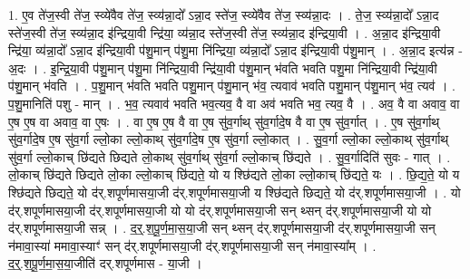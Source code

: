 \documentclass[17pt]{extarticle}
\begin{document}
1. ए॒व ते॑ज॒स्वी ते॑ज॒ स्व्ये॑वैव ते॑ज॒ स्व्य॑न्ना॒दो᳚ ऽन्ना॒द स्ते॑ज॒ स्व्ये॑वैव ते॑ज॒ स्व्य॑न्ना॒दः । . ते॒ज॒ स्व्य॑न्ना॒दो᳚ ऽन्ना॒द स्ते॑ज॒स्वी ते॑ज॒ स्व्य॑न्ना॒द इ॑न्द्रिया॒वी न्द्रि॑या॒ व्य॑न्ना॒द स्ते॑ज॒स्वी ते॑ज॒ स्व्य॑न्ना॒द इ॑न्द्रिया॒वी । . अ॒न्ना॒द इ॑न्द्रिया॒वी न्द्रि॑या॒ व्य॑न्ना॒दो᳚ ऽन्ना॒द इ॑न्द्रिया॒वी प॑शु॒मान् प॑शु॒मा नि॑न्द्रिया॒ व्य॑न्ना॒दो᳚ ऽन्ना॒द इ॑न्द्रिया॒वी प॑शु॒मान् । . अ॒न्ना॒द इत्य॑न्न - अ॒दः । . इ॒न्द्रि॒या॒वी प॑शु॒मान् प॑शु॒मा नि॑न्द्रिया॒वी न्द्रि॑या॒वी प॑शु॒मान् भ॑वति भवति पशु॒मा नि॑न्द्रिया॒वी न्द्रि॑या॒वी प॑शु॒मान् भ॑वति । . प॒शु॒मान् भ॑वति भवति पशु॒मान् प॑शु॒मान् भ॑व॒ त्यवाव॑ भवति पशु॒मान् प॑शु॒मान् भ॑व॒ त्यव॑ । . प॒शु॒मानिति॑ पशु - मान् । . भ॒व॒ त्यवाव॑ भवति भव॒त्यव॒ वै वा अव॑ भवति भव॒ त्यव॒ वै । . अव॒ वै वा अवाव॒ वा ए॒ष ए॒ष वा अवाव॒ वा ए॒षः । . वा ए॒ष ए॒ष वै वा ए॒ष सु॑व॒र्गाथ् सु॑व॒र्गादे॒ष वै वा ए॒ष सु॑व॒र्गात् । . ए॒ष सु॑व॒र्गाथ् सु॑व॒र्गादे॒ष ए॒ष सु॑व॒र्गा ल्लो॒का ल्लो॒काथ् सु॑व॒र्गादे॒ष ए॒ष सु॑व॒र्गा ल्लो॒कात् । . सु॒व॒र्गा ल्लो॒का ल्लो॒काथ् सु॑व॒र्गाथ् सु॑व॒र्गा ल्लो॒काच् छि॑द्यते छिद्यते लो॒काथ् सु॑व॒र्गाथ् सु॑व॒र्गा ल्लो॒काच् छि॑द्यते । . सु॒व॒र्गादिति॑ सुवः - गात् । . लो॒काच् छि॑द्यते छिद्यते लो॒का ल्लो॒काच् छि॑द्यते॒ यो य श्छि॑द्यते लो॒का ल्लो॒काच् छि॑द्यते॒ यः । . छि॒द्य॒ते॒ यो य श्छि॑द्यते छिद्यते॒ यो द॑र्.शपूर्णमासया॒जी द॑र्.शपूर्णमासया॒जी य श्छि॑द्यते छिद्यते॒ यो द॑र्.शपूर्णमासया॒जी । . यो द॑र्.शपूर्णमासया॒जी द॑र्.शपूर्णमासया॒जी यो यो द॑र्.शपूर्णमासया॒जी सन् थ्सन् द॑र्.शपूर्णमासया॒जी यो यो द॑र्.शपूर्णमासया॒जी सन्न् । . द॒र्॒.श॒पू॒र्ण॒मा॒स॒या॒जी सन् थ्सन् द॑र्.शपूर्णमासया॒जी द॑र्.शपूर्णमासया॒जी सन् न॑मावा॒स्या॑ ममावा॒स्याꣳ॑ सन् द॑र्.शपूर्णमासया॒जी द॑र्.शपूर्णमासया॒जी सन् न॑मावा॒स्या᳚म् । . द॒र्॒.श॒पू॒र्ण॒मा॒स॒या॒जीति॑ दर्.शपूर्णमास - या॒जी । \newline
\end{document}
